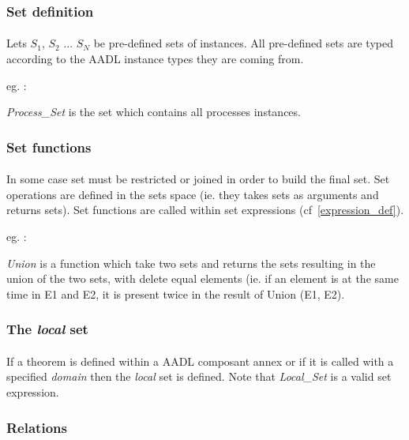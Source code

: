 \subsubsection {Set definition}
\paragraph{}
Lets $S_1$, $S_2$ ... $S_N$ be pre-defined sets of instances. 
All pre-defined sets are typed according to the AADL instance 
types they are coming from.

eg. :

\textit{Process\_Set} is the set which contains all processes 
instances.

\subsubsection {Set functions}
\label {set_operations}

\paragraph{}
In some case set must be restricted or joined in order to build 
the final set. Set operations are defined in the sets space (ie. 
they takes sets as arguments and returns sets). Set functions are
called within set expressions (cf~\ref{expression_def}).

eg. : 

\textit{Union} is a function which take two sets and returns 
the sets resulting in the union of the two sets, with delete 
equal elements (ie. if an element is at the same time in E1 
and E2, it is present twice in the result of Union (E1, E2).

\subsubsection {The \textit{local} set}

\paragraph{}
If a theorem is defined within a AADL composant annex or if it is 
called with a specified \textit{domain} then the \textit{local} set 
is defined. Note that \textit{Local\_Set} is a valid set expression.

\subsubsection{Relations}
\label {relation_def}

